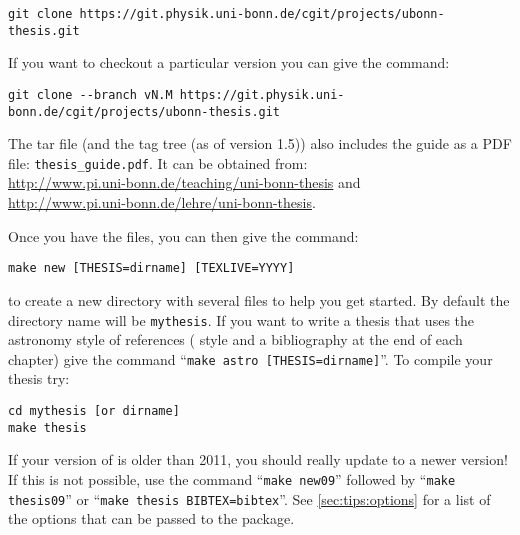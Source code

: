 {\small
\begin{verbatim}
git clone https://git.physik.uni-bonn.de/cgit/projects/ubonn-thesis.git
\end{verbatim}
}
\noindent
If you want to checkout a particular version you can give the command:
{\small
\begin{verbatim}
git clone --branch vN.M https://git.physik.uni-bonn.de/cgit/projects/ubonn-thesis.git
\end{verbatim}
}
\noindent
The tar file (and the tag tree (as of version 1.5)) also includes
the guide as a PDF file: \texttt{thesis\_guide.pdf}.  It can be
obtained from:\\
\url{http://www.pi.uni-bonn.de/teaching/uni-bonn-thesis}
and\\
\url{http://www.pi.uni-bonn.de/lehre/uni-bonn-thesis}.

\par\noindent
Once you have the files, you can then give the command:
\begin{verbatim}
make new [THESIS=dirname] [TEXLIVE=YYYY]
\end{verbatim}
to create a new directory with several files to help you get
started. By default the directory name will be \texttt{mythesis}.
If you want to write a thesis that uses the astronomy style of references
( style and a bibliography at the end of each chapter)
give the command \enquote{\texttt{make astro [THESIS=dirname]}}.
To compile your thesis try:
\begin{verbatim}
cd mythesis [or dirname]
make thesis
\end{verbatim}
If your version of \TeXLive is older than 2011, 
you should really update to a newer version!
If this is not possible, use the command \enquote{\texttt{make new09}}
followed by \enquote{\texttt{make thesis09}}
or \enquote{\texttt{make thesis BIBTEX=bibtex}}.
See \cref{sec:tips:options} for a list of the options that can be passed to the package.

